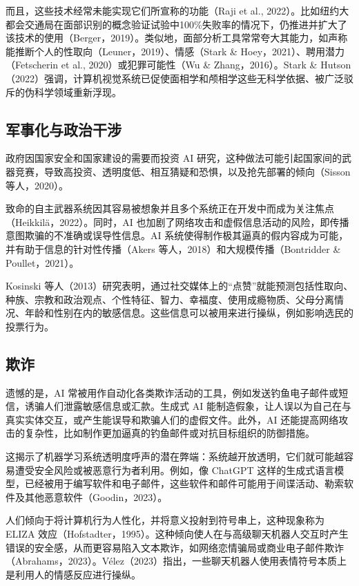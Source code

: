 \documentclass[lang=cn,newtx,10pt,scheme=chinese]{elegantbook}
\begin{document}
而且，这些技术经常未能实现它们所宣称的功能（Raji et al., 2022）。比如纽约大都会交通局在面部识别的概念验证试验中100\%失败率的情况下，仍推进并扩大了该技术的使用（Berger，2019）。类似地，面部分析工具常常夸大其能力，如声称能推断个人的性取向（Leuner，2019）、情感（Stark \& Hoey，2021）、聘用潜力（Fetscherin et al., 2020）或犯罪可能性（Wu \& Zhang，2016）。Stark \& Hutson（2022）强调，计算机视觉系统已促使面相学和颅相学这些无科学依据、被广泛驳斥的伪科学领域重新浮现。

\subsection{军事化与政治干涉}
政府因国家安全和国家建设的需要而投资 AI 研究，这种做法可能引起国家间的武器竞赛，导致高投资、透明度低、相互猜疑和恐惧，以及抢先部署的倾向（Sisson 等人，2020）。

致命的自主武器系统因其容易被想象并且多个系统正在开发中而成为关注焦点（Heikkilä，2022）。同时，AI 也加剧了网络攻击和虚假信息活动的风险，即传播意图欺骗的不准确或误导性信息。AI 系统使得制作极其逼真的假内容成为可能，并有助于信息的针对性传播（Akers 等人，2018）和大规模传播（Bontridder \& Poullet，2021）。

Kosinski 等人（2013）研究表明，通过社交媒体上的“点赞”就能预测包括性取向、种族、宗教和政治观点、个性特征、智力、幸福度、使用成瘾物质、父母分离情况、年龄和性别在内的敏感信息。这些信息可以被用来进行操纵，例如影响选民的投票行为。

\subsection{欺诈}
遗憾的是，AI 常被用作自动化各类欺诈活动的工具，例如发送钓鱼电子邮件或短信，诱骗人们泄露敏感信息或汇款。生成式 AI 能制造假象，让人误以为自己在与真实实体交互，或产生能误导和欺骗人们的虚假文件。此外，AI 还能提高网络攻击的复杂性，比如制作更加逼真的钓鱼邮件或对抗目标组织的防御措施。

这揭示了机器学习系统透明度呼声的潜在弊端：系统越开放透明，它们就可能越容易遭受安全风险或被恶意行为者利用。例如，像 ChatGPT 这样的生成式语言模型，已经被用于编写软件和电子邮件，这些软件和邮件可能用于间谍活动、勒索软件及其他恶意软件（Goodin，2023）。

人们倾向于将计算机行为人性化，并将意义投射到符号串上，这种现象称为 ELIZA 效应（Hofstadter，1995）。这种倾向使人在与高级聊天机器人交互时产生错误的安全感，从而更容易陷入文本欺诈，如网络恋情骗局或商业电子邮件欺诈（Abrahams，2023）。Vélez（2023）指出，一些聊天机器人使用表情符号本质上是利用人的情感反应进行操纵。
\end{document}
